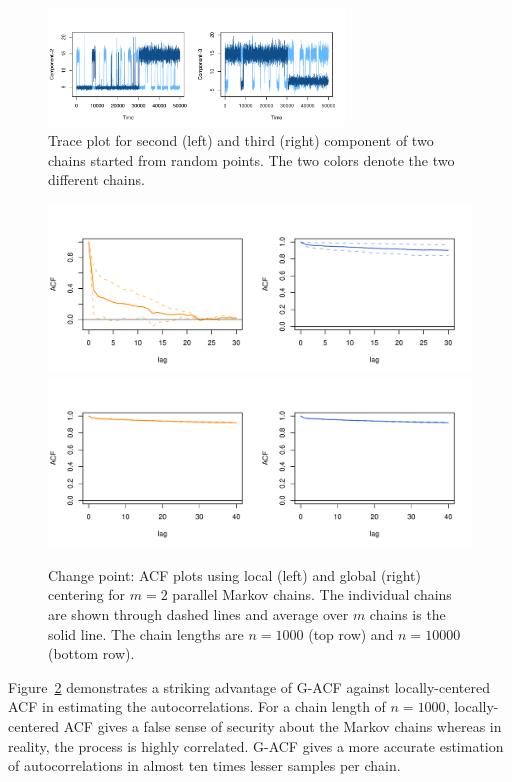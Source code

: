 \documentclass[11pt]{article}
\theoremstyle{remark}
\begin{document}
\begin{figure}[htbp]
    \centering
    \includegraphics[width = 0.7\textwidth]{plots/poisson-trace_n50000.pdf}
    \caption{Trace plot for second (left) and third (right) component of two chains started from random points. The two colors denote the two different chains.}
    \label{fig:poisson-trace}
\end{figure}
\begin{figure}[htbp]
    \centering
      \includegraphics[width = .6\textwidth]{plots/poisson-acf_n1000.pdf}  \\ \vspace{-.5cm}
      \includegraphics[width = .6\textwidth]{plots/poisson-acf_n10000.pdf}      
    \caption{Change point: ACF plots using local (left) and global (right) centering for $m=2$ parallel Markov chains. The individual chains are shown through dashed lines and average over $m$ chains is the solid line. The chain lengths are $n = 1000$ (top row) and $n = 10000$ (bottom row).}
    \label{fig:poisson-acf}
\end{figure}

Figure~\ref{fig:poisson-acf} demonstrates a striking advantage of G-ACF against locally-centered ACF in estimating the autocorrelations. For a chain length of $n=1000$, locally-centered ACF gives a false sense of security about the Markov chains whereas in reality, the process is highly correlated. G-ACF gives a more accurate estimation of autocorrelations in almost ten times lesser samples per chain.
\end{document}
